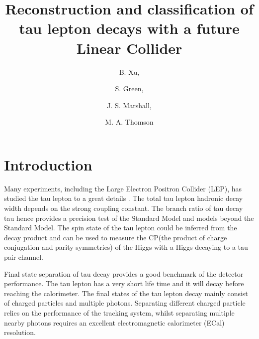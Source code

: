 \documentclass[a4paper,11pt]{article}
\title{\boldmath Reconstruction and classification of tau lepton decays with a future Linear Collider}
\author[a,1]{B. Xu,\note{Corresponding author.}}
\author[a]{S. Green,}
\author[a]{J. S. Marshall,}
\author[a]{M. A. Thomson}
\affiliation[a]{Cavendish Laboratory,\\JJ Thomson Avenue, Cambridge, CB3 0HE, UK}
\begin{document}
\maketitle
\flushbottom


\section{Introduction}

Many experiments, including the Large Electron Positron Collider (LEP), has studied the tau lepton to a great details \cite{Schael:2005am}. The total tau lepton hadronic decay width depends on the strong coupling constant. The branch ratio of tau decay tau hence provides a precision test of the Standard Model and models beyond the Standard Model. The spin state of the tau lepton could be inferred from the decay product and can be used to measure the CP(the product of charge conjugation and parity symmetries) of the Higgs with a Higgs decaying to a tau pair channel.



Final state separation of tau decay provides a good benchmark of the detector performance. The tau lepton has a very short life time and it will decay before reaching the calorimeter. The final states of the tau lepton decay mainly consist of charged particles and multiple photons. Separating different charged particle relies on the performance of the tracking system, whilst separating multiple nearby photons requires an excellent electromagnetic calorimeter (ECal) resolution. 

\end{document}
